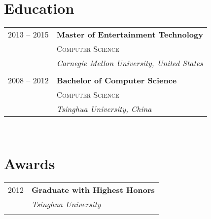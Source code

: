 \documentclass[10pt]{article}
\begin{document}
{\begin{minipage}[t]{0.44\textwidth}

\section{Education} 

\begin{tabular}{rl} %


2013 -- 2015 & \textbf{Master of Entertainment Technology} \\ 
& \textsc{Computer Science} \\ 
& \textit{Carnegie Mellon University, United States}\\
&\\


2008 -- 2012 & \textbf{Bachelor of Computer Science}\\
& \textsc{Computer Science} \\
& \textit{Tsinghua University, China} 
	

\end{tabular}\\[10pt]


\section{Awards} 

\begin{tabular}{rl}
2012	 & \textbf{Graduate with Highest Honors}\\
& \textit{Tsinghua University}\\ \\



\end{tabular}
\end{minipage}}
\end{document}
